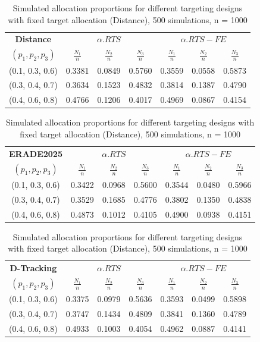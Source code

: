\documentclass{article}
\begin{document}
\begin{table}[h]
	\centering
	\small
	\begin{tabular}{c|ccc|ccc}
		\hline
		\textbf{Distance} & \multicolumn{3}{c|}{\(\alpha.RTS\)} & \multicolumn{3}{c}{\(\alpha.RTS-FE\)} \\
		$(p_1, p_2, p_3)$
		& $\frac{N_1}{n}$ & $\frac{N_2}{n}$ & $\frac{N_3}{n}$
		& $\frac{N_1}{n}$ & $\frac{N_2}{n}$ & $\frac{N_3}{n}$ \\
		\hline
		(0.1, 0.3, 0.6) & 0.3381 & 0.0849 & 0.5760 & 0.3559 & 0.0558 & 0.5873 \\
		(0.3, 0.4, 0.7) & 0.3634 & 0.1523 & 0.4832 & 0.3814 & 0.1387 & 0.4790 \\
		(0.4, 0.6, 0.8) & 0.4766 & 0.1206 & 0.4017 & 0.4969 & 0.0867 & 0.4154 \\
		\hline
	\end{tabular}
	
\vspace{0.4cm}

	\begin{tabular}{c|ccc|ccc}
		\hline
		\textbf{ERADE2025} & \multicolumn{3}{c|}{\(\alpha.RTS\)} & \multicolumn{3}{c}{\(\alpha.RTS-FE\)} \\
		$(p_1, p_2, p_3)$
		& $\frac{N_1}{n}$ & $\frac{N_2}{n}$ & $\frac{N_3}{n}$
		& $\frac{N_1}{n}$ & $\frac{N_2}{n}$ & $\frac{N_3}{n}$ \\
		\hline
		(0.1, 0.3, 0.6) & 0.3422 & 0.0968 & 0.5600 & 0.3544 & 0.0480 & 0.5966 \\
		(0.3, 0.4, 0.7) & 0.3529 & 0.1685 & 0.4776 & 0.3802 & 0.1350 & 0.4838 \\
		(0.4, 0.6, 0.8) & 0.4873 & 0.1012 & 0.4105 & 0.4900 & 0.0938 & 0.4151 \\
		\hline
	\end{tabular}
	
\vspace{0.4cm}

	\begin{tabular}{c|ccc|ccc}
		\hline
		\textbf{D-Tracking} & \multicolumn{3}{c|}{\(\alpha.RTS\)} & \multicolumn{3}{c}{\(\alpha.RTS-FE\)} \\
		$(p_1, p_2, p_3)$
		& $\frac{N_1}{n}$ & $\frac{N_2}{n}$ & $\frac{N_3}{n}$
		& $\frac{N_1}{n}$ & $\frac{N_2}{n}$ & $\frac{N_3}{n}$ \\
		\hline
		(0.1, 0.3, 0.6) & 0.3375 & 0.0979 & 0.5636 & 0.3593 & 0.0499 & 0.5898 \\
		(0.3, 0.4, 0.7) & 0.3747 & 0.1434 & 0.4809 & 0.3841 & 0.1360 & 0.4789 \\
		(0.4, 0.6, 0.8) & 0.4933 & 0.1003 & 0.4054 & 0.4962 & 0.0887 & 0.4141 \\
		\hline
	\end{tabular}
	
\vspace{0.4cm}

	\caption{Simulated allocation proportions for different targeting designs with fixed target allocation (Distance), 500 simulations, n = 1000}
	\label{tab:sparse-target}
\end{table}
\end{document}
